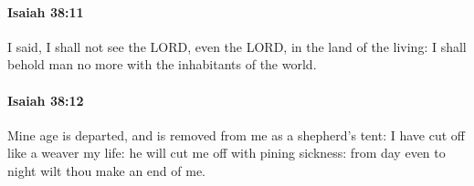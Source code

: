 		\paragraph{Isaiah 38:11} %
			\label{ISAIAH-38-11}

			I said, I shall not see the LORD, even the LORD, in the land of the living: I shall behold man no more with the inhabitants of the world.


		\paragraph{Isaiah 38:12} %
			\label{ISAIAH-38-12}

			Mine age is departed, and is removed from me as a shepherd's tent: I have cut off like a weaver my life: he will cut me off with pining sickness: from day even to night wilt thou make an end of me.


